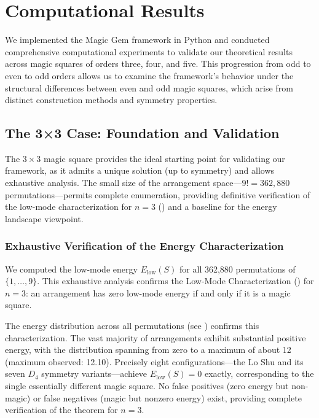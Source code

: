 \section{Computational Results}
\label{sec:results}

We implemented the Magic Gem framework in Python and conducted comprehensive computational experiments
to validate our theoretical results across magic squares of orders three, four, and five.
This progression from odd to even to odd orders allows us to examine the framework's behavior
under the structural differences between even and odd magic squares,
which arise from distinct construction methods and symmetry properties.

\subsection{The 3×3 Case: Foundation and Validation}

The $3 \times 3$ magic square provides the ideal starting point for validating our framework,
as it admits a unique solution (up to symmetry) and allows exhaustive analysis.
The small size of the arrangement space---$9! = 362{,}880$ permutations---permits 
complete enumeration, providing definitive verification of the low-mode characterization for $n=3$
() and a baseline for the energy landscape viewpoint.

\subsubsection{Exhaustive Verification of the Energy Characterization}

We computed the low-mode energy $E_{\mathrm{low}}(S)$ for all 362,880 permutations of $\{1, \ldots, 9\}$.
This exhaustive analysis confirms the Low-Mode Characterization () for $n=3$:
an arrangement has zero low-mode energy if and only if it is a magic square.

The energy distribution across all permutations (see ) confirms this characterization.
The vast majority of arrangements exhibit substantial positive energy,
with the distribution spanning from zero to a maximum of about 12 (maximum observed: 12.10).
Precisely eight configurations---the Lo Shu and its seven $D_4$ symmetry variants---achieve 
$E_{\mathrm{low}}(S) = 0$ exactly, corresponding to the single essentially different magic square.
No false positives (zero energy but non-magic) or false negatives (magic but nonzero energy) exist,
providing complete verification of the theorem for $n = 3$.

